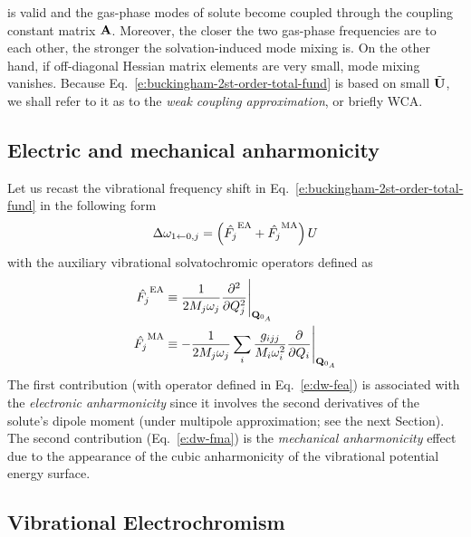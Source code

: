 \documentclass[a4paper,titlepage,twoside,fleqn,12pt]{book}
\begin{document}
\begin{refsection}
is valid and the gas\hyp{}phase modes of solute become coupled
through the coupling constant matrix $\bf A$. Moreover, the closer
the two gas\hyp{}phase frequencies are to each other, the stronger the solvation\hyp{}induced
mode mixing is. On the other hand, if off\hyp{}diagonal Hessian matrix elements are
very small, mode mixing vanishes. Because Eq.~\eqref{e:buckingham-2st-order-total-fund}
is based on small $\tilde{\bf U}$, we shall refer to it
as to the \emph{weak coupling approximation}, or briefly WCA.

\subsection{Electric and mechanical anharmonicity\label{s:ea-mea}}

Let us recast the vibrational frequency shift in Eq.~\eqref{e:buckingham-2st-order-total-fund}
in the following form
%
\begin{equation} 
 \Delta\omega_{1\leftarrow 0,j} = \left( \hat{F_j}^{\rm EA} + \hat{F_j}^{\rm MA}\right) U
\end{equation}
%
with the auxiliary vibrational solvatochromic operators defined as
%
\begin{subequations} \label{e:dw-fea-fma}
 \begin{align}
  \hat{F_j}^{\rm EA} &\equiv  \frac{1}{2M_j\omega_j} \frac{\partial^2}{\partial Q_j^2} \Bigg|_{{\bf Q}_{0_A}} 
         \label{e:dw-fea}\\
  \hat{F_j}^{\rm MA} &\equiv -\frac{1}{2M_j\omega_j} 
             \sum_i \frac{g_{ijj}}{M_i\omega_i^2} \frac{\partial}{\partial Q_i} \Bigg|_{{\bf Q}_{0_A}} 
         \label{e:dw-fma}
 \end{align}
\end{subequations}
%
The first contribution (with operator defined in Eq.~\eqref{e:dw-fea}) 
is associated with the \emph{electronic anharmonicity}
since it involves the second derivatives of the solute's dipole
moment (under multipole approximation; see the next Section). 
The second contribution (Eq.~\eqref{e:dw-fma})
is the \emph{mechanical anharmonicity} effect due to the appearance of the 
cubic anharmonicity of the vibrational potential energy surface.

\subsection{Vibrational Electrochromism\label{s:vibr-electrochromism}}


\end{refsection}
\end{document}
